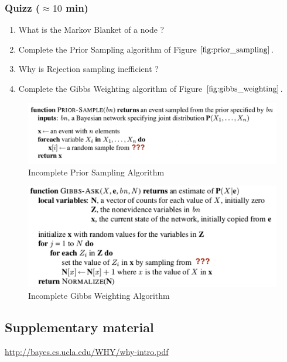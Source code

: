 \documentclass[a4paper, 10pt]{article}
\begin{document}
\subsubsection{Quizz ($\approx 10$ min)}
\begin{enumerate}
    \item What is the Markov Blanket of a node ?
    \item Complete the Prior Sampling algorithm of Figure $\ref{fig:prior_sampling}$.
    \item Why is Rejection sampling inefficient ?
    \item Complete the Gibbs Weighting algorithm of Figure $\ref{fig:gibbs_weighting}$.
\end{enumerate}
\begin{figure}
    \centering
    \includegraphics[width=1.\textwidth]{figures/prior_sampling.png}
    \caption{Incomplete Prior Sampling Algorithm}
    \label{fig:prior_sampling}
\end{figure}
\begin{figure}
    \centering
    \includegraphics[width=1.\textwidth]{figures/gibbs_weighting.png}
    \caption{Incomplete Gibbs Weighting Algorithm}
    \label{fig:gibbs_weighting}
\end{figure}
   \subsection{Supplementary material}
   \url{http://bayes.cs.ucla.edu/WHY/why-intro.pdf}
   
 
   
   
\end{document}
